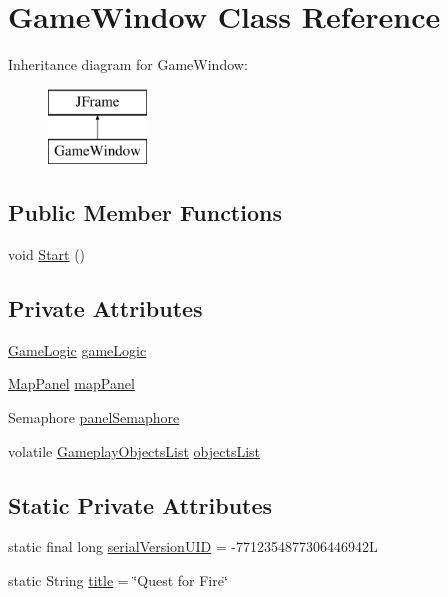 \hypertarget{classGameWindow}{\section{Game\-Window Class Reference}
\label{classGameWindow}
}
Inheritance diagram for Game\-Window\-:\begin{figure}[H]
\begin{center}
\leavevmode
\includegraphics[height=2.000000cm]{d3/dce/classGameWindow}
\end{center}
\end{figure}
\subsection*{Public Member Functions}
\begin{DoxyCompactItemize}
\item 
void \hyperlink{classGameWindow_a94d5bf99fbc4d6e6e15897ce3babadae}{Start} ()
\end{DoxyCompactItemize}
\subsection*{Private Attributes}
\begin{DoxyCompactItemize}
\item 
\hyperlink{classGameLogic}{Game\-Logic} \hyperlink{classGameWindow_afdc585949ce286ac31b620d4680e4a40}{game\-Logic}
\item 
\hyperlink{classMapPanel}{Map\-Panel} \hyperlink{classGameWindow_a6695d85b00f5b75982b4e0afe8b49149}{map\-Panel}
\item 
Semaphore \hyperlink{classGameWindow_abb7ba8d8b4b506372e17a1f5c523ca6b}{panel\-Semaphore}
\item 
volatile \hyperlink{classGameplayObjectsList}{Gameplay\-Objects\-List} \hyperlink{classGameWindow_acd0adf7ae69050f844a07b90f4891536}{objects\-List}
\end{DoxyCompactItemize}
\subsection*{Static Private Attributes}
\begin{DoxyCompactItemize}
\item 
static final long \hyperlink{classGameWindow_a29133b2b32da4e6fc4c63ea6438c6050}{serial\-Version\-U\-I\-D} = -\/7712354877306446942\-L
\item 
static String \hyperlink{classGameWindow_aca5fe59b0761d6873e1d7b48cd37ea8c}{title} = \char`\"{}Quest for Fire\char`\"{}
\end{DoxyCompactItemize}


